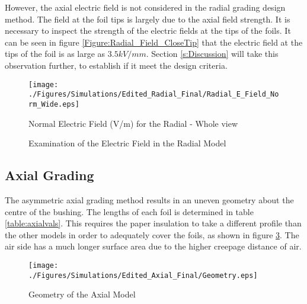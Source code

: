 However, the axial electric field is not considered in the radial grading design method.
The field at the foil tips is largely due to the axial field strength.
It is necessary to inspect the strength of the electric fields at the tips of the foils.
It can be seen in figure \ref{Figure:Radial_Field_CloseTip} that the electric field at the tips of the foil is as large as $3.5kV/mm$.
Section \ref{s:Discussion} will take this observation further, to establish if it meet the design criteria.

\begin{figure}[!h]
  \centering
    \texttt{[image: ./Figures/Simulations/Edited\_Radial\_Final/Radial\_E\_Field\_Norm\_Wide.eps]} 
	\caption{Normal Electric Field (V/m) for the Radial - Whole view}
	\label{Figure:Radial_Field_Wide}
   \end{figure}

\begin{figure}[!h]
  \centering
{} 
\caption{Examination of the Electric Field in the Radial Model}
\label{Figure:Radial_Field}
\end{figure}




\subsection{Axial Grading}
The asymmetric axial grading method results in an uneven geometry about the centre of the bushing.
The lengths of each foil is determined in table \ref{table:axialvals}.
This requires the paper insulation to take a different profile than the other models in order to adequately cover the foils, as shown in figure \ref{Figure:Axial_Geom}.
The air side has a much longer surface area due to the higher creepage distance of air.
\begin{figure}[!h]
  \centering
    \texttt{[image: ./Figures/Simulations/Edited\_Axial\_Final/Geometry.eps]} 
	\caption{Geometry of the Axial Model}
	\label{Figure:Axial_Geom}
\end{figure}

